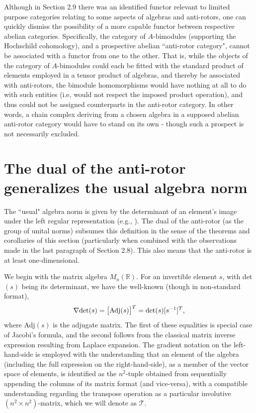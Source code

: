 \documentclass{amsart}
\numberwithin{equation}{section}
\theoremstyle{definition}
\numberwithin{theorem}{section}
\begin{document}
Although in Section 2.9 there was an identified functor relevant to limited purpose categories relating to some aspects of algebras and anti-rotors, one can quickly dismiss the possibility of a more capable functor between respective abelian categories.  Specifically, the category of $A$-bimodules (supporting the Hochschild cohomology), and a prospective abelian ``anti-rotor category", cannot be associated with a functor from one to the other.  That is, while the objects of the category of $A$-bimodules could each be fitted with the standard product of elements employed in a tensor product of algebras, and thereby be associated with anti-rotors, the bimodule homomorphisms would have nothing at all to do with such entities (i.e, would not respect the imposed product operation), and thus could not be assigned counterparts in the anti-rotor category.  In other words, a chain complex deriving from a chosen algebra in a supposed abelian anti-rotor category would have to stand on its own - though such a prospect is not necessarily excluded.


\section{The dual of the anti-rotor generalizes the usual algebra norm} 

The ``usual" algebra norm is given by the determinant of an element's image under the left regular representation (e.g., \cite{bourbaki:1989}).  The dual of the anti-rotor (as the group of unital norms) subsumes this definition in the sense of the theorems and corollaries of this section (particularly when combined with the observations made in the last paragraph of Section 2.8).  This also means that the anti-rotor is at least one-dimensional.

 We begin with the matrix algebra $ M_n(\mathbb{R})$. For an invertible element $s$, with det$(s)$ being its determinant, we have the well-known (though in non-standard format),
  \begin{equation}\label{11/5/21.1} \nabla \mbox{det}(s) = \big[{\rm Adj}(s)\big]^T = \mbox{det}(s)[s^{-1}]^T,\end{equation} where Adj$(s)$ is the adjugate matrix.  The first of these equalities is special case of Jacobi's formula, and the second follows from the classical matrix inverse expression resulting from Laplace expansion.  The gradient notation on the left-hand-side is employed with the understanding that an element of the algebra (including the full expression on the right-hand-side), as a member of the vector space of elements, is identified as the $n^2$-tuple obtained from sequentially appending the columns of its matrix format (and vice-versa), with a compatible understanding  regarding the transpose operation as a particular involutive $(n^2\times n^2)$-matrix, which we will denote as $\mathcal{T}$. 
  
\end{document}
